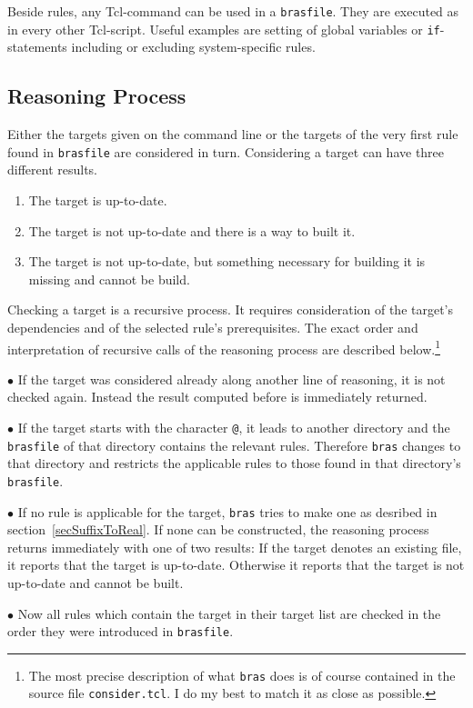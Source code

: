 \documentclass[12pt]{article}
\newcommand{\bras}{\texttt{bras}}
\begin{document}
{Beside rules, any Tcl-command can be used in a \texttt{brasfile}. They
are executed as in every other Tcl-script. Useful examples are setting
of global variables or \texttt{if}-statements including or excluding
system-specific rules.

\subsection{Reasoning Process}
Either the targets given on the command line or the targets of the
very first rule found in \texttt{brasfile} are considered in
turn. Considering a target can have three different results. 
\begin{enumerate}
\item
The target is up-to-date.
\item
The target is not up-to-date and there is a way to built it.
\item
The target is not up-to-date, but something necessary for building it
is missing and cannot be build.
\end{enumerate}
Checking a target is a recursive process. It requires consideration of
the target's dependencies and of the selected rule's
prerequisites. The exact order and interpretation of recursive calls
of the reasoning process are described below.\footnote{The most
precise description of what \bras{} does is of course contained in the
source file \texttt{consider.tcl}. I do my best to match it as close
as possible.}

$\bullet$ If the target was considered already along another line of
reasoning, it is not checked again. Instead the result computed before
is immediately returned.

$\bullet$ If the target starts with the character \texttt{@}, it leads
to another directory and the \texttt{brasfile} of that directory
contains the relevant rules. Therefore \bras{} changes to that
directory and restricts the applicable rules to those found in that
directory's \texttt{brasfile}.

$\bullet$ If no rule is applicable for the target, \bras{} tries to
make one as desribed in section~\ref{secSuffixToReal}. If none can be
constructed, the reasoning process returns immediately with one of two
results: If the target denotes an existing file, it reports that the
target is up-to-date. Otherwise it reports that the target is not
up-to-date and cannot be built.

$\bullet$ Now all rules which contain the target in their target list
are checked in the order they were introduced in
\texttt{brasfile}. 

}
\end{document}
